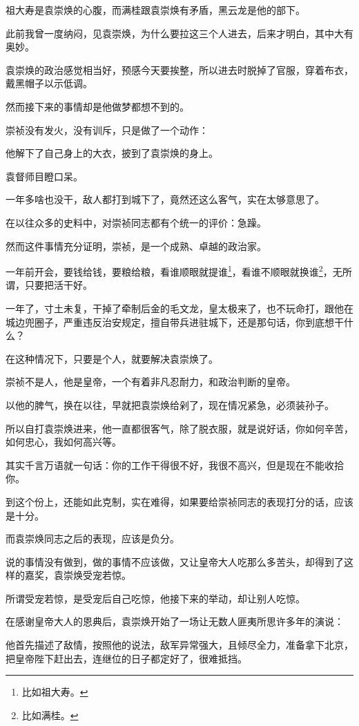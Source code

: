 \begin{multicols}{\theparacolNo}
		祖大寿是袁崇焕的心腹，而满桂跟袁崇焕有矛盾，黑云龙是他的部下。

		此前我曾一度纳闷，见袁崇焕，为什么要拉这三个人进去，后来才明白，其中大有奥妙。

		袁崇焕的政治感觉相当好，预感今天要挨整，所以进去时脱掉了官服，穿着布衣，戴黑帽子以示低调。

		然而接下来的事情却是他做梦都想不到的。

		崇祯没有发火，没有训斥，只是做了一个动作：

		他解下了自己身上的大衣，披到了袁崇焕的身上。

		袁督师目瞪口呆。

		一年多啥也没干，敌人都打到城下了，竟然还这么客气，实在太够意思了。

		在以往众多的史料中，对崇祯同志都有个统一的评价：急躁。

		然而这件事情充分证明，崇祯，是一个成熟、卓越的政治家。

		一年前开会，要钱给钱，要粮给粮，看谁顺眼就提谁\footnote{比如祖大寿。}，看谁不顺眼就换谁\footnote{比如满桂。}，无所谓，只要把活干好。

		一年了，寸土未复，干掉了牵制后金的毛文龙，皇太极来了，也不玩命打，跟他在城边兜圈子，严重违反治安规定，擅自带兵进驻城下，还是那句话，你到底想干什么？

		在这种情况下，只要是个人，就要解决袁崇焕了。

		崇祯不是人，他是皇帝，一个有着非凡忍耐力，和政治判断的皇帝。

		以他的脾气，换在以往，早就把袁崇焕给剁了，现在情况紧急，必须装孙子。

		所以自打袁崇焕进来，他一直都很客气，除了脱衣服，就是说好话，你如何辛苦，如何忠心，我如何高兴等。

		其实千言万语就一句话：你的工作干得很不好，我很不高兴，但是现在不能收拾你。

		到这个份上，还能如此克制，实在难得，如果要给崇祯同志的表现打分的话，应该是十分。

		而袁崇焕同志之后的表现，应该是负分。

		说的事情没有做到，做的事情不应该做，又让皇帝大人吃那么多苦头，却得到了这样的嘉奖，袁崇焕受宠若惊。

		所谓受宠若惊，是受宠后自己吃惊，他接下来的举动，却让别人吃惊。

		在感谢皇帝大人的恩典后，袁崇焕开始了一场让无数人匪夷所思许多年的演说：

		他首先描述了敌情，按照他的说法，敌军异常强大，且倾尽全力，准备拿下北京，把皇帝陛下赶出去，连继位的日子都定好了，很难抵挡。


\end{multicols}
